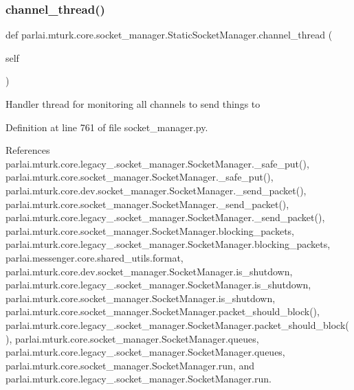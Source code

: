 \subsubsection{\texorpdfstring{channel\+\_\+thread()}{channel\_thread()}}
{\footnotesize\ttfamily def parlai.\+mturk.\+core.\+socket\+\_\+manager.\+Static\+Socket\+Manager.\+channel\+\_\+thread (\begin{DoxyParamCaption}\item[{}]{self }\end{DoxyParamCaption})}

\begin{DoxyVerb}Handler thread for monitoring all channels to send things to\end{DoxyVerb}
 

Definition at line 761 of file socket\+\_\+manager.\+py.



References parlai.\+mturk.\+core.\+legacy\+\_.\+socket\+\_\+manager.\+Socket\+Manager.\+\_\+safe\+\_\+put(), parlai.\+mturk.\+core.\+socket\+\_\+manager.\+Socket\+Manager.\+\_\+safe\+\_\+put(), parlai.\+mturk.\+core.\+dev.\+socket\+\_\+manager.\+Socket\+Manager.\+\_\+send\+\_\+packet(), parlai.\+mturk.\+core.\+socket\+\_\+manager.\+Socket\+Manager.\+\_\+send\+\_\+packet(), parlai.\+mturk.\+core.\+legacy\+\_.\+socket\+\_\+manager.\+Socket\+Manager.\+\_\+send\+\_\+packet(), parlai.\+mturk.\+core.\+socket\+\_\+manager.\+Socket\+Manager.\+blocking\+\_\+packets, parlai.\+mturk.\+core.\+legacy\+\_.\+socket\+\_\+manager.\+Socket\+Manager.\+blocking\+\_\+packets, parlai.\+messenger.\+core.\+shared\+\_\+utils.\+format, parlai.\+mturk.\+core.\+dev.\+socket\+\_\+manager.\+Socket\+Manager.\+is\+\_\+shutdown, parlai.\+mturk.\+core.\+legacy\+\_.\+socket\+\_\+manager.\+Socket\+Manager.\+is\+\_\+shutdown, parlai.\+mturk.\+core.\+socket\+\_\+manager.\+Socket\+Manager.\+is\+\_\+shutdown, parlai.\+mturk.\+core.\+socket\+\_\+manager.\+Socket\+Manager.\+packet\+\_\+should\+\_\+block(), parlai.\+mturk.\+core.\+legacy\+\_.\+socket\+\_\+manager.\+Socket\+Manager.\+packet\+\_\+should\+\_\+block(), parlai.\+mturk.\+core.\+socket\+\_\+manager.\+Socket\+Manager.\+queues, parlai.\+mturk.\+core.\+legacy\+\_.\+socket\+\_\+manager.\+Socket\+Manager.\+queues, parlai.\+mturk.\+core.\+socket\+\_\+manager.\+Socket\+Manager.\+run, and parlai.\+mturk.\+core.\+legacy\+\_.\+socket\+\_\+manager.\+Socket\+Manager.\+run.

